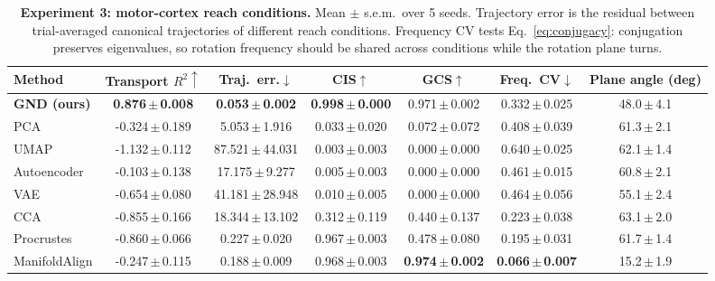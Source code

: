 \begin{table}[t]
\centering
\caption{\textbf{Experiment 3: motor-cortex reach conditions.} Mean $\pm$ s.e.m.\ over 5 seeds. Trajectory error is the residual between trial-averaged canonical trajectories of different reach conditions. Frequency CV tests Eq.~\eqref{eq:conjugacy}: conjugation preserves eigenvalues, so rotation frequency should be shared across conditions while the rotation plane turns.}
\label{tab:motor}
\vspace{2pt}
\small
\begin{tabular}{lcccccc}
\toprule
Method & Transport $R^2\!\uparrow$ & Traj.\ err.$\downarrow$ & CIS$\uparrow$ & GCS$\uparrow$ & Freq.\ CV$\downarrow$ & Plane angle (deg) \\
\midrule
\textbf{GND (ours)} & \textbf{0.876\,\tiny{$\pm$\,0.008}} & \textbf{0.053\,\tiny{$\pm$\,0.002}} & \textbf{0.998\,\tiny{$\pm$\,0.000}} & 0.971\,\tiny{$\pm$\,0.002} & 0.332\,\tiny{$\pm$\,0.025} & 48.0\,\tiny{$\pm$\,4.1} \\
\midrule
PCA & -0.324\,\tiny{$\pm$\,0.189} & 5.053\,\tiny{$\pm$\,1.916} & 0.033\,\tiny{$\pm$\,0.020} & 0.072\,\tiny{$\pm$\,0.072} & 0.408\,\tiny{$\pm$\,0.039} & 61.3\,\tiny{$\pm$\,2.1} \\
UMAP & -1.132\,\tiny{$\pm$\,0.112} & 87.521\,\tiny{$\pm$\,44.031} & 0.003\,\tiny{$\pm$\,0.003} & 0.000\,\tiny{$\pm$\,0.000} & 0.640\,\tiny{$\pm$\,0.025} & 62.1\,\tiny{$\pm$\,1.4} \\
Autoencoder & -0.103\,\tiny{$\pm$\,0.138} & 17.175\,\tiny{$\pm$\,9.277} & 0.005\,\tiny{$\pm$\,0.003} & 0.000\,\tiny{$\pm$\,0.000} & 0.461\,\tiny{$\pm$\,0.015} & 60.8\,\tiny{$\pm$\,2.1} \\
VAE & -0.654\,\tiny{$\pm$\,0.080} & 41.181\,\tiny{$\pm$\,28.948} & 0.010\,\tiny{$\pm$\,0.005} & 0.000\,\tiny{$\pm$\,0.000} & 0.464\,\tiny{$\pm$\,0.056} & 55.1\,\tiny{$\pm$\,2.4} \\
CCA & -0.855\,\tiny{$\pm$\,0.166} & 18.344\,\tiny{$\pm$\,13.102} & 0.312\,\tiny{$\pm$\,0.119} & 0.440\,\tiny{$\pm$\,0.137} & 0.223\,\tiny{$\pm$\,0.038} & 63.1\,\tiny{$\pm$\,2.0} \\
Procrustes & -0.860\,\tiny{$\pm$\,0.066} & 0.227\,\tiny{$\pm$\,0.020} & 0.967\,\tiny{$\pm$\,0.003} & 0.478\,\tiny{$\pm$\,0.080} & 0.195\,\tiny{$\pm$\,0.031} & 61.7\,\tiny{$\pm$\,1.4} \\
ManifoldAlign & -0.247\,\tiny{$\pm$\,0.115} & 0.188\,\tiny{$\pm$\,0.009} & 0.968\,\tiny{$\pm$\,0.003} & \textbf{0.974\,\tiny{$\pm$\,0.002}} & \textbf{0.066\,\tiny{$\pm$\,0.007}} & 15.2\,\tiny{$\pm$\,1.9} \\
\bottomrule
\end{tabular}
\end{table}
